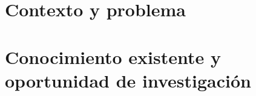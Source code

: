 \documentclass[12pt,a4paper,oneside]{article}
\begin{document}


\clearpage
{}


\clearpage
\tableofcontents

\clearpage
{}

\part{Contexto y problema}






\part{Conocimiento existente y oportunidad de investigación}







% 
% 
% 
% 
% 

% 
% 
% 
% 
% 
\end{document}
